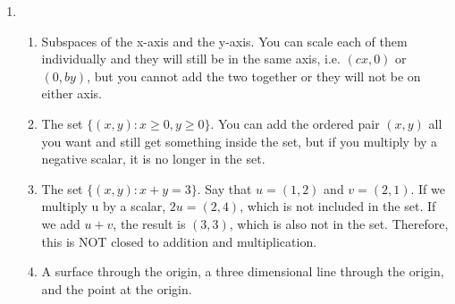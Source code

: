 \documentclass{article}
\begin{document}
\begin{enumerate}
\begin{enumerate}
\end{enumerate}

\item

\begin{enumerate}

\item Subspaces of the x-axis and the y-axis. You can scale each of them individually and they will still be in the same axis, i.e. $(cx,0)$ or $(0,by)$, but you cannot add the two together or they will not be on either axis.

\item The set $\{(x,y) : x \geq 0, y \geq 0\}$. You can add the ordered pair $(x,y)$ all you want and still get something inside the set, but if you multiply by a negative scalar, it is no longer in the set.

\item The set $\{(x,y) : x + y = 3\}$. Say that $u = (1,2)$ and $v = (2,1)$. If we multiply u by a scalar, $2u = (2,4)$, which is not included in the set. If we add $u + v$, the result is $(3,3)$, which is also not in the set. Therefore, this is NOT closed to addition and multiplication.

\item A surface through the origin, a three dimensional line through the origin, and the point at the origin.
\end{enumerate}

\end{enumerate}
\end{document}
